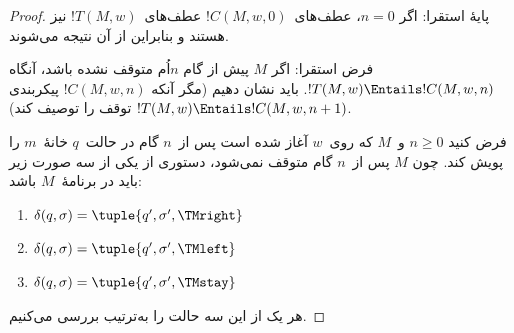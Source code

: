 \documentclass[../../../include/open-logic-section]{subfiles}
\begin{document}
\begin{proof}
پایهٔ استقرا: اگر $n=0$، عطف‌های~$!C(M,w,0)$ عطف‌های~$!T(M,w)$ نیز
هستند و بنابراین از آن نتیجه می‌شوند.

فرض استقرا: اگر $M$ پیش از گام $n$اُم متوقف نشده باشد، آنگاه
$!T(M,w)\Entails !C(M,w,n)$. باید نشان دهیم (مگر آنکه
$!C(M,w,n)$ پیکربندی توقف را توصیف کند)
$!T(M,w)\Entails !C(M,w,n+1)$.

فرض کنید $n\ge 0$ و~$M$ که روی~$w$ آغاز شده است پس از~$n$ گام در
حالت~$q$ خانهٔ~$m$ را پویش کند. چون $M$ پس از~$n$ گام متوقف نمی‌شود،
دستوری از یکی از سه صورت زیر باید در برنامهٔ~$M$ باشد:

\begin{enumerate}
\item {} $\delta(q, \sigma) = \tuple{q', \sigma', \TMright}$

\item {} $\delta(q, \sigma) = \tuple{q', \sigma', \TMleft}$

\item {} $\delta(q, \sigma) = \tuple{q', \sigma', \TMstay}$
\end{enumerate}

هر یک از این سه حالت را به‌ترتیب بررسی می‌کنیم.


\end{proof}
\end{document}
